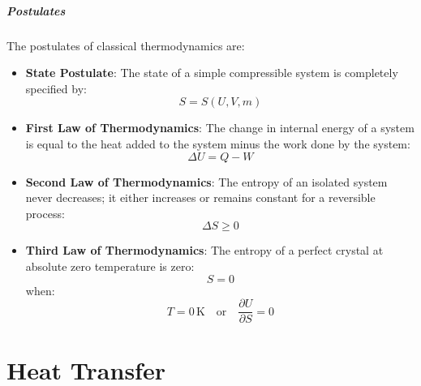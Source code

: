 \documentclass[11pt]{report}
\begin{document}
\paragraph{Postulates} The postulates of classical thermodynamics are:
\begin{itemize}
    \item \textbf{State Postulate}: The state of a simple compressible system is completely specified by:
    \begin{equation}
        S = S(U, V, m)
    \end{equation} 
    \item \textbf{First Law of Thermodynamics}: The change in internal energy of a system is equal to the heat added to the system minus the work done by the system:
    \begin{equation}
        \Delta U = Q - W
    \end{equation}
    \item \textbf{Second Law of Thermodynamics}: The entropy of an isolated system never decreases; it either increases or remains constant for a reversible process:
    \begin{equation}
        \Delta S \geq 0
    \end{equation}
    \item \textbf{Third Law of Thermodynamics}: The entropy of a perfect crystal at absolute zero temperature is zero:
    \begin{equation}
        S = 0
    \end{equation}
    when:
    \begin{equation}
        T = 0\, \text{K} \quad \text{or} \quad \frac{\partial U}{\partial S} = 0
    \end{equation}
\end{itemize}
    
\chapter{Heat Transfer}
\end{document}

